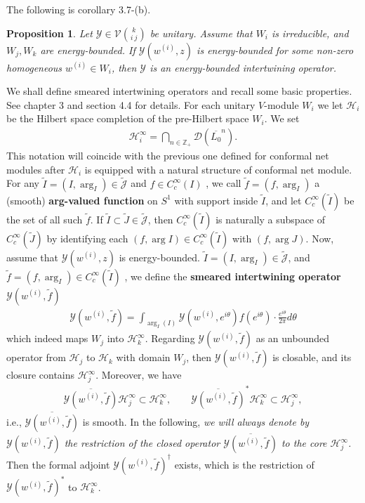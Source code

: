 \documentclass[11pt,b5paper,notitlepage]{article}
\theoremstyle{definition}
\theoremstyle{plain}
\newtheorem{pp}[df]{Proposition}
\newcommand{\mc}{\mathcal}
\newcommand{\wtd}{\widetilde}
\newcommand{\ovl}{\overline}
\newcommand{\Dom}{\scr D}
\newcommand{\scr}{\mathscr}
\newcommand{\Jtd}{\widetilde{\mathcal J}}
\newcommand{\mbb}{\mathbb}
\numberwithin{equation}{subsection}
\begin{document}
The following is \cite{Gui19a} corollary 3.7-(b).

\begin{pp}\label{lb53}
Let $\mc Y\in\mc V{k\choose i~j}$ be unitary. Assume that $W_i$ is irreducible, and $W_j,W_k$ are energy-bounded. If $\mc Y(w^{(i)},z)$ is energy-bounded for some non-zero homogeneous $w^{(i)}\in W_i$, then $\mc Y$ is an energy-bounded intertwining operator.
\end{pp}

We shall define smeared intertwining operators and recall some basic properties. See \cite{Gui19a} chapter 3 and \cite{Gui21a} section 4.4 for details. For each unitary $V$-module $W_i$ we let $\mc H_i$ be the Hilbert space completion of the pre-Hilbert space $W_i$. We set 
\begin{align*}
\mc H_i^\infty=\bigcap_{n\in\mbb Z_+}\Dom(\ovl{L_0}^n).
\end{align*}
This notation will coincide with the previous one defined for conformal net modules after $\mc H_i$ is equipped with a natural structure of conformal net module. For any $\wtd I=(I,\arg_I)\in\Jtd$ and $f\in C^\infty_c(I)$ , we call $\wtd f=(f,\arg_I)$ a (smooth) \textbf{arg-valued function} on $S^1$ with support inside $\wtd I$, and let $C^\infty_c(\wtd I)$ be the set of all such $\wtd f$.  If $\wtd I\subset\wtd J\in\Jtd$, then $C^\infty_c(\wtd I)$ is naturally a subspace of $C^\infty_c(\wtd J)$ by identifying each $(f,\arg I)\in C^\infty_c(\wtd I)$ with $(f,\arg J)$. Now, assume that $\mc Y(w^{(i)},z)$ is energy-bounded. $\wtd I=(I,\arg_I)\in\Jtd$, and $\wtd f=(f,\arg_I)\in C^\infty_c(\wtd I)$ , we  define the \textbf{smeared intertwining operator} $\mc Y(w^{(i)},\wtd f)$ 
\begin{align}
\mc Y(w^{(i)},\wtd f)=\int_{\arg_I(I)}\mc Y(w^{(i)},e^{i\theta})f(e^{i\theta})\cdot\frac{e^{i\theta}}{2\pi}d\theta
\end{align}
which indeed maps $W_j$ into $\mc H_k^\infty$.
Regarding $\mc Y(w^{(i)},\wtd f)$ as an unbounded operator from $\mc H_j$ to $\mc H_k$ with domain $W_j$, then $\mc Y(w^{(i)},\wtd f)$ is closable, and its closure  contains $\mc H_j^\infty$. Moreover, we have
\begin{gather*}
\ovl{\mc Y(w^{(i)},\wtd f)}\mc H_j^\infty\subset\mc H_k^\infty,\qquad \ovl{\mc Y(w^{(i)},\wtd f)}^*\mc H_k^\infty\subset\mc H_j^\infty,
\end{gather*}
i.e., $\ovl{\mc Y(w^{(i)},\wtd f)}$ is smooth. In the following, \emph{we will always denote by $\mc Y(w^{(i)},\wtd f)$ the restriction of the closed operator $\ovl{\mc Y(w^{(i)},\wtd f)}$ to the core $\mc H_j^\infty$.} Then the formal adjoint $\mc Y(w^{(i)},\wtd f)^\dagger$ exists, which is the restriction of $\mc Y(w^{(i)},\wtd f)^*$ to $\mc H_k^\infty$.
\end{document}
